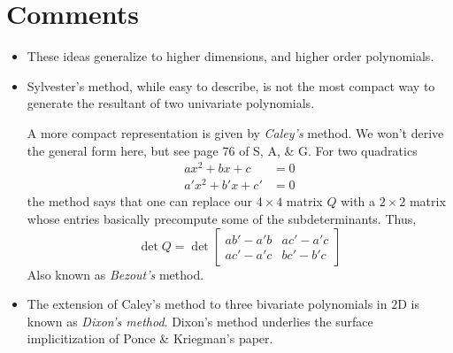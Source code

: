 \section{Comments}
\label{sec:comments}

\begin{itemize}
\item These ideas generalize to higher dimensions, and higher order
  polynomials.
\item Sylvester's method, while easy to describe, is not the most
  compact way to generate the resultant of two univariate polynomials.

  A more compact representation is given by \textit{Caley's}
  method. We won't derive the general form here, but see page 76 of S,
  A, \& G. For two quadratics
  \begin{align*}
    ax^2 + bx + c &= 0 \\
    a'x^2 + b'x + c' &= 0
  \end{align*}
  the method says that one can replace our $4\times 4 $ matrix $Q$
  with a $2 \times 2$ matrix whose entries basically precompute some
  of the subdeterminants. Thus,
  \begin{equation*}
    \det Q = \det
    \begin{bmatrix}
      ab' - a'b & ac' - a'c \\
      ac' - a'c & bc' - b'c
    \end{bmatrix}
  \end{equation*}
  Also known as \textit{Bezout's} method.
\item The extension of Caley's method to three bivariate polynomials
  in $2$D is known as \textit{Dixon's method}. Dixon's method
  underlies the surface implicitization of Ponce \& Kriegman's paper.
\end{itemize}

